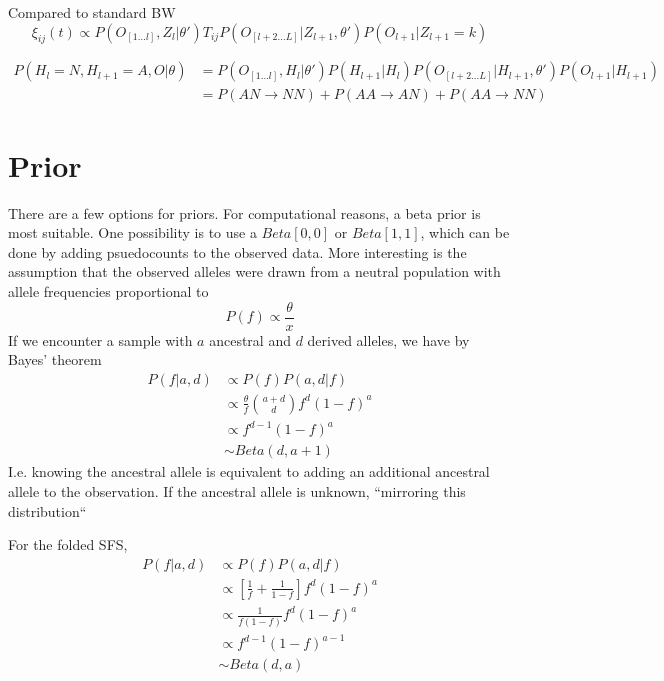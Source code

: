 \documentclass[10pt,a4paper]{article}
\begin{document}
Compared to standard BW
$$\xi_{ij}(t) \propto P(O_{[1\dots l]}, Z_l | \theta') T_{ij}  P(O_{[l+2\dots L]}|Z_{l+1}, \theta') P(O_{l+1}|Z_{l+1}=k)$$

\begin{align}
P(H_l = N, H_{l+1} = A, O |\theta) &=  P(O_{[1\dots l]}, H_l | \theta') P(H_{l+1} | H_l) P(O_{[l+2\dots L]}|H_{l+1}, \theta') P(O_{l+1}|H_{l+1})\\
&=P(AN \to NN) + P(AA \to AN) + P(AA \to NN)
\end{align}




\section{Prior}
There are a few options for priors. For computational reasons, a beta prior is most suitable.
One possibility is to use a $Beta[0,0]$ or $Beta[1,1]$, which can be done by adding psuedocounts to the observed data.
More interesting is the assumption that the observed alleles were drawn from a neutral population with allele frequencies proportional to 
\begin{equation}
P(f) \propto \frac{\theta}{x}
\end{equation}
If we encounter a sample with $a$ ancestral and $d$ derived alleles, we have by Bayes' theorem
\begin{align}
P(f | a, d) &\propto P(f) P(a, d|f) \nonumber\\
 &\propto \frac{\theta}{f} \binom{a+d}{d} f^d (1-f)^a \nonumber\\
 &\propto f^{d-1} (1-f)^a \nonumber\\
&\sim Beta(d, a+1)
\end{align}
I.e. knowing the ancestral allele is equivalent to adding an additional ancestral allele to the observation. If the ancestral allele is unknown, ``mirroring this distribution``

For the folded SFS,
\begin{align}
P(f | a, d) &\propto P(f) P(a, d|f) \nonumber\\
&\propto \left[ \frac{1}{f} + \frac{1}{1-f}\right] f^d (1-f)^a\nonumber\\
&\propto \frac{1}{f(1-f)} f^d (1-f)^a\nonumber\\
&\propto f^{d-1} (1-f)^{a-1} \nonumber\\
&\sim Beta(d, a)
\end{align}
\end{document}
